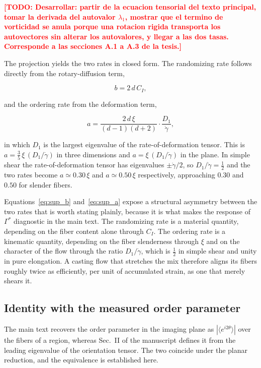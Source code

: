 \documentclass[%
  aip,
  pof,
  reprint,
  floatfix
]{revtex4-2}
\newcommand{\todo}[1]{\textcolor{red}{\textbf{[TODO: #1]}}}
\begin{document}
\todo{Desarrollar: partir de la ecuacion tensorial del texto principal, tomar la derivada del autovalor $\lambda_1$, mostrar que el termino de vorticidad se anula porque una rotacion rigida transporta los autovectores sin alterar los autovalores, y llegar a las dos tasas. Corresponde a las secciones A.1 a A.3 de la tesis.}

The projection yields the two rates in closed form. The randomizing rate follows directly from the rotary-diffusion term,

\begin{equation}
    b = 2\,d\,C_I,
    \label{eq:sup_b}
\end{equation}

and the ordering rate from the deformation term,

\begin{equation}
    a = \frac{2\,d\,\xi}{(d-1)(d+2)}\cdot\frac{D_1}{\dot{\gamma}},
    \label{eq:sup_a}
\end{equation}

in which $D_1$ is the largest eigenvalue of the rate-of-deformation tensor. This is $a = \tfrac{3}{5}\,\xi\,(D_1/\dot{\gamma})$ in three dimensions and $a = \xi\,(D_1/\dot{\gamma})$ in the plane. In simple shear the rate-of-deformation tensor has eigenvalues $\pm\dot{\gamma}/2$, so $D_1/\dot{\gamma} = \tfrac{1}{2}$ and the two rates become $a \simeq 0.30\,\xi$ and $a \simeq 0.50\,\xi$ respectively, approaching $0.30$ and $0.50$ for slender fibers.

Equations~\eqref{eq:sup_b} and~\eqref{eq:sup_a} expose a structural asymmetry between the two rates that is worth stating plainly, because it is what makes the response of $\Gamma^{*}$ diagnostic in the main text. The randomizing rate is a material quantity, depending on the fiber content alone through $C_I$. The ordering rate is a kinematic quantity, depending on the fiber slenderness through $\xi$ and on the character of the flow through the ratio $D_1/\dot{\gamma}$, which is $\tfrac{1}{2}$ in simple shear and unity in pure elongation. A casting flow that stretches the mix therefore aligns its fibers roughly twice as efficiently, per unit of accumulated strain, as one that merely shears it.

\subsection{Identity with the measured order parameter}

The main text recovers the order parameter in the imaging plane as $|\langle e^{i2\theta}\rangle|$ over the fibers of a region, whereas Sec.~II of the manuscript defines it from the leading eigenvalue of the orientation tensor. The two coincide under the planar reduction, and the equivalence is established here.
\end{document}
